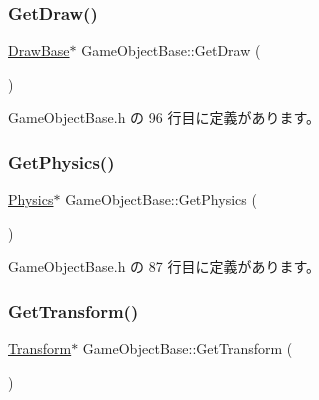 \subsubsection{\texorpdfstring{Get\+Draw()}{GetDraw()}}
{\footnotesize\ttfamily \mbox{\hyperlink{class_draw_base}{Draw\+Base}}$\ast$ Game\+Object\+Base\+::\+Get\+Draw (\begin{DoxyParamCaption}{ }\end{DoxyParamCaption})\hspace{0.3cm}{\ttfamily [inline]}}



 Game\+Object\+Base.\+h の 96 行目に定義があります。

\mbox{\label{class_game_object_base_a853cdb5dbb2edf28e45e49540f85e554}} 
\subsubsection{\texorpdfstring{Get\+Physics()}{GetPhysics()}}
{\footnotesize\ttfamily \mbox{\hyperlink{class_physics}{Physics}}$\ast$ Game\+Object\+Base\+::\+Get\+Physics (\begin{DoxyParamCaption}{ }\end{DoxyParamCaption})\hspace{0.3cm}{\ttfamily [inline]}}



 Game\+Object\+Base.\+h の 87 行目に定義があります。

\mbox{\label{class_game_object_base_a7df1e16838f8fa578a27e8ba64652b49}} 
\subsubsection{\texorpdfstring{Get\+Transform()}{GetTransform()}}
{\footnotesize\ttfamily \mbox{\hyperlink{class_transform}{Transform}}$\ast$ Game\+Object\+Base\+::\+Get\+Transform (\begin{DoxyParamCaption}{ }\end{DoxyParamCaption})\hspace{0.3cm}{\ttfamily [inline]}}



